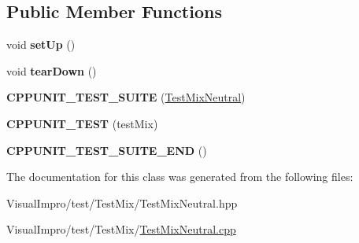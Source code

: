 \subsection*{Public Member Functions}
\begin{DoxyCompactItemize}
\item 
\mbox{\label{class_test_mix_neutral_a58e5c68ef4ed306cd25baa5e96c46f6f}} 
void {\bfseries set\+Up} ()
\item 
\mbox{\label{class_test_mix_neutral_aafa12bb3715c8a1a48fef78e4b31fdc3}} 
void {\bfseries tear\+Down} ()
\item 
\mbox{\label{class_test_mix_neutral_a8b482b1ff2fc4f6beee38654d1edcb8c}} 
{\bfseries C\+P\+P\+U\+N\+I\+T\+\_\+\+T\+E\+S\+T\+\_\+\+S\+U\+I\+TE} (\mbox{\hyperlink{class_test_mix_neutral}{Test\+Mix\+Neutral}})
\item 
\mbox{\label{class_test_mix_neutral_a18371f286ed8c4f367c1e162bd219219}} 
{\bfseries C\+P\+P\+U\+N\+I\+T\+\_\+\+T\+E\+ST} (test\+Mix)
\item 
\mbox{\label{class_test_mix_neutral_a4aef0603a02eeadf6c2a871ced83ec80}} 
{\bfseries C\+P\+P\+U\+N\+I\+T\+\_\+\+T\+E\+S\+T\+\_\+\+S\+U\+I\+T\+E\+\_\+\+E\+ND} ()
\end{DoxyCompactItemize}


The documentation for this class was generated from the following files\+:\begin{DoxyCompactItemize}
\item 
Visual\+Impro/test/\+Test\+Mix/Test\+Mix\+Neutral.\+hpp\item 
Visual\+Impro/test/\+Test\+Mix/\mbox{\hyperlink{_test_mix_neutral_8cpp}{Test\+Mix\+Neutral.\+cpp}}\end{DoxyCompactItemize}
